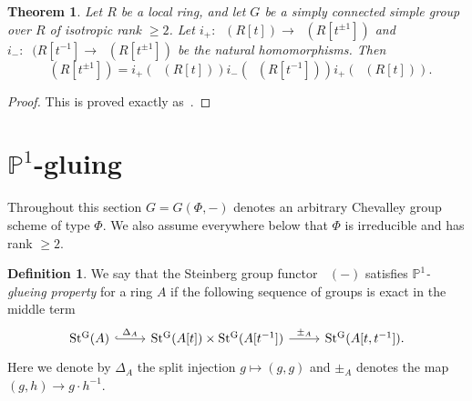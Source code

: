 \documentclass[oneside,12pt]{amsart}
\newtheorem{thm}{Theorem}
\numberwithin{equation}{section}
\numberwithin{lem}{section}
\theoremstyle{definition}
\newtheorem{dfn}[lem]{Definition}
\theoremstyle{remark}
\DeclareMathOperator{\St}{St^G}
\newcommand{\Pro}{\mathbb{P}}
\begin{document}
\begin{thm}\label{thm:3t}
Let $R$ be a local ring, and let $G$ be a simply connected simple group over $R$
of isotropic rank $\ge 2$. Let $i_+:\St(R[t])\to\St(R[t^{\pm 1}])$ and $i_-:\St(R[t^{-1}]\to
\St(R[t^{\pm 1}])$ be the natural homomorphisms.
Then
$$
\St(R[t^{\pm 1}])=i_+(\St(R[t]))i_-(\St(R[t^{-1}]))i_+(\St(R[t])).
$$
\end{thm}
\begin{proof}
This is proved exactly as~\cite[Theorem 5.1]{St-poly}.
\end{proof}




\section{\texorpdfstring{$\Pro^1$}{P\textonesuperior}-gluing}
Throughout this section $G=G(\Phi, -)$ denotes an arbitrary Chevalley group scheme of type $\Phi$.
We also assume everywhere below that $\Phi$ is irreducible and has rank $\geq 2$.

\begin{dfn} \label{def:p1g} We say that the Steinberg group functor $\St(-)$ satisfies \emph{$\Pro^1$-glueing property} for a ring $A$ if the following sequence of groups is exact in the middle term
\[ \begin{tikzcd} \St(A) \ar[r, hookrightarrow, "\Delta_A"] & \St(A[t]) \times \St(A[t^{-1}]) \ar[r, "\pm_A"] & \St(A[t, t^{-1}]). \end{tikzcd} \]
Here we denote by $\Delta_A$ the split injection $g \mapsto (g, g)$ and $\pm_A$ denotes the map $(g, h) \rightarrow g \cdot h^{-1}$.
\end{dfn}
\end{document}
